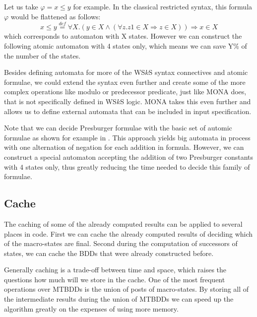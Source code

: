  \noindent\hrulefill
 \begin{example}
 Let us take $\varphi = x \leq y$ for example. In the classical restricted
 syntax, this formula $\varphi$ would be flattened as follows:
 \begin{equation}
  x \leq y \overset{\mathit{def}}{=} \forall X. (y \in X \wedge (\forall z. z1
  \in X \Rightarrow z \in X)) \Rightarrow x \in X
 \end{equation} 
 which corresponds to automaton with X states. However we can construct the
 following atomic automaton with 4 states only, which means we can save Y\% of
 the number of the states.
 \end{example}
 \noindent\hrulefill
 
 Besides defining automata for more of the WS$k$S syntax connectives and atomic
 formulae, we could extend the syntax even further and create some of the more
 complex operations like modulo or predecessor predicate, just like
 \textsc{MONA} does, that is not specifically defined in WS$k$S logic.
 \textsc{MONA} \cite{mona-secrets} takes this even further and allows us to
 define external automata that can be included in input specification.
 
 Note that we can decide Presburger formulae \cite{presburger} with the basic
 set of automic formulae as shown for example in \cite{presburger-wsks}. This
 approach yields big automata in process with one alternation of negation for
 each addition in formula. However, we can construct a special automaton
 accepting the addition of two Presburger constants with 4 states only, thus
 greatly reducing the time needed to decide this family of formulae.
 
 \subsection{Cache}
 
 The caching of some of the already computed results can be applied to several
 places in code. First we can cache the already computed results of deciding
 which of the macro-states are final. Second during the computation of
 successors of states, we can cache the BDDs that were already constructed before.
 
 Generally caching is a trade-off between time and space, which raises the
 questions how much will we store in the cache. One of the most frequent
 operations over MTBDDs is the union of posts of macro-states. By storing all of
 the intermediate results during the union of MTBDDs we can speed up the
 algorithm greatly on the expenses of using more memory.
  
